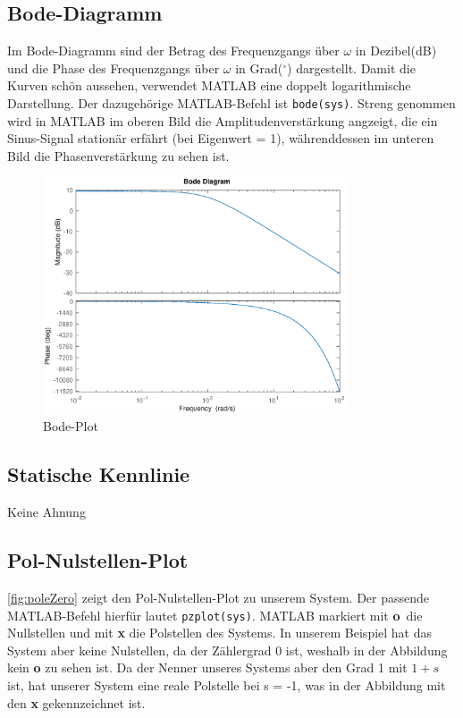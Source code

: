 \subsection{Bode-Diagramm}
Im Bode-Diagramm sind der Betrag des Frequenzgangs über $\omega$ in Dezibel(dB) und die Phase des Frequenzgangs über $\omega$ in Grad($^\circ$) dargestellt. Damit die Kurven schön aussehen, verwendet MATLAB eine doppelt logarithmische Darstellung. Der dazugehörige MATLAB-Befehl ist \texttt{bode(sys)}. Streng genommen wird in MATLAB im oberen Bild die Amplitudenverstärkung angzeigt, die ein Sinus-Signal stationär erfährt (bei Eigenwert = 1), währenddessen im unteren Bild die Phasenverstärkung zu sehen ist.

\begin{figure}[H]
    \label{fig:bode}
    \centering
    \includegraphics[width=0.8\textwidth]{Bilder/BodePT1Tt.eps}
    \caption{Bode-Plot}
 \end{figure}

\subsection{Statische Kennlinie}
Keine Ahnung

\subsection{Pol-Nulstellen-Plot}
\autoref{fig:poleZero} zeigt den Pol-Nulstellen-Plot zu unserem System. Der passende MATLAB-Befehl hierfür lautet \texttt{pzplot(sys)}. MATLAB markiert mit \textbf{o} die Nullstellen und mit \textbf{x} die Polstellen des Systems. In unserem Beispiel hat das System aber keine Nulstellen, da der Zählergrad 0 ist, weshalb in der Abbildung kein \textbf{o} zu sehen ist. Da der Nenner unseres Systems aber den Grad 1 mit $1 + s$ ist, hat unserer System eine reale Polstelle bei s = -1, was in der Abbildung mit den \textbf{x} gekennzeichnet ist.

